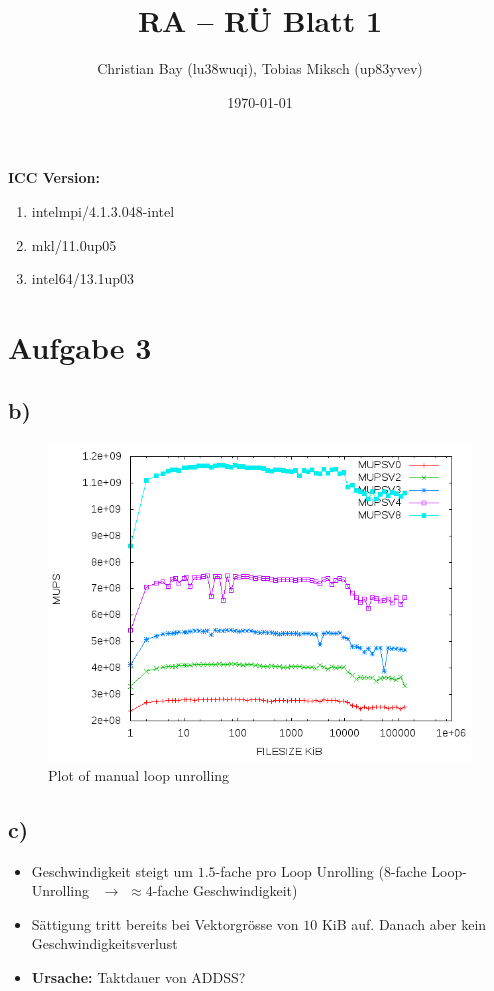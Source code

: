 \documentclass{article}
\title{RA -- R\"U Blatt 1}
\author{Christian Bay (lu38wuqi), Tobias Miksch (up83yvev)}
\date{\today}
\begin{document}
\maketitle

\textbf{ICC Version:}
\begin{enumerate}
	\item intelmpi/4.1.3.048-intel
	\item mkl/11.0up05
	\item intel64/13.1up03
\end{enumerate}

\vspace*{6pt}

\section*{Aufgabe 3}
\subsection*{b)}

\begin{center}
	\begin{figure}[h]
	\includegraphics[scale=0.6]{pics/a3b.png}
	\caption{Plot of manual loop unrolling}
	\end{figure}
\end{center}

\subsection*{c)}
\begin{itemize}
	\item Geschwindigkeit steigt um $1.5$-fache pro Loop Unrolling ($8$-fache Loop-Unrolling \
		$\rightarrow$ $\approx4$-fache Geschwindigkeit)
	\item Sättigung tritt bereits bei Vektorgr\"osse von $10$ KiB auf. Danach aber kein
		Geschwindigkeitsverlust
	\item \textbf{Ursache:} Taktdauer von ADDSS?
\end{itemize}
\end{document}

